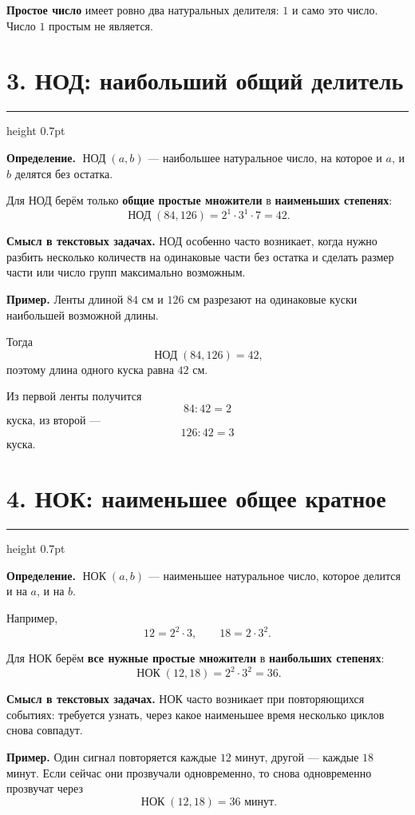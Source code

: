 \documentclass[a4paper,12pt]{article}
\newcommand{\sectionline}{%
  \par\vspace{0.1em}%
  {\color{accent}\hrule height 0.7pt}%
  \vspace{0.55em}}
\newcommand{\key}[1]{\textcolor{darkaccent}{\textbf{#1}}}
\newcommand{\GCDru}{\mathop{\text{НОД}}\nolimits}
\newcommand{\LCMru}{\mathop{\text{НОК}}\nolimits}
\begin{document}
\textbf{Простое число} имеет ровно два натуральных делителя:
$1$ и само это число.
Число $1$ простым не является.

\section*{3. НОД: наибольший общий делитель}
\sectionline

\textbf{Определение.}
$\GCDru(a,b)$ --- наибольшее натуральное число,
на которое и $a$, и $b$ делятся без остатка.

Для НОД берём только
\key{общие простые множители}
в
\key{наименьших степенях}:
\[
\GCDru(84,126)
=
2^1\cdot3^1\cdot7
=
42.
\]

\textbf{Смысл в текстовых задачах.}
НОД особенно часто возникает,
когда нужно разбить несколько количеств
на одинаковые части без остатка
и сделать размер части или число групп
максимально возможным.

\textbf{Пример.}
Ленты длиной $84$ см и $126$ см
разрезают на одинаковые куски
наибольшей возможной длины.

Тогда
\[
\GCDru(84,126)=42,
\]
поэтому длина одного куска равна $42$ см.

Из первой ленты получится
\[
84:42=2
\]
куска, из второй ---
\[
126:42=3
\]
куска.

\section*{4. НОК: наименьшее общее кратное}
\sectionline

\textbf{Определение.}
$\LCMru(a,b)$ --- наименьшее натуральное число,
которое делится и на $a$, и на $b$.

Например,
\[
12=2^2\cdot3,
\qquad
18=2\cdot3^2.
\]

Для НОК берём
\key{все нужные простые множители}
в
\key{наибольших степенях}:
\[
\LCMru(12,18)
=
2^2\cdot3^2
=
36.
\]

\textbf{Смысл в текстовых задачах.}
НОК часто возникает при повторяющихся событиях:
требуется узнать,
через какое наименьшее время
несколько циклов снова совпадут.

\textbf{Пример.}
Один сигнал повторяется каждые $12$ минут,
другой --- каждые $18$ минут.
Если сейчас они прозвучали одновременно,
то снова одновременно прозвучат через
\[
\LCMru(12,18)=36\text{ минут}.
\]
\end{document}
